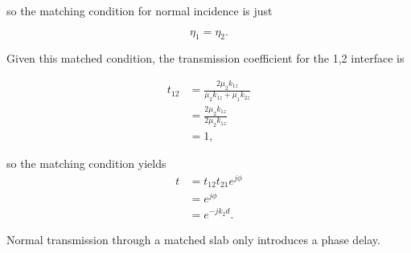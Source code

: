 so the matching condition for normal incidence is just

\begin{dmath}\label{eqn:twoInterfaceNormal:280}
\eta_1 = \eta_2.
\end{dmath}

Given this matched condition, the transmission coefficient for the 1,2 interface is

\begin{dmath}\label{eqn:twoInterfaceNormal:300}
\begin{aligned}
t_{12} 
&= \frac{2 \mu_2 k_{1z}}{\mu_2 k_{1z} + \mu_1 k_{2z}} \\
&= \frac{2 \mu_2 k_{1z}}{2 \mu_2 k_{1z} } \\
&= 1,
\end{aligned}
\end{dmath}

so the matching condition yields
\begin{dmath}\label{eqn:twoInterfaceNormal:320}
\begin{aligned}
t 
&= 
t_{12} t_{21} e^{j\phi} \\
&= 
e^{j\phi} \\
&= 
e^{-j k_2 d}.
\end{aligned}
\end{dmath}

Normal transmission through a matched slab only introduces a phase delay.

\EndNoBibArticle

